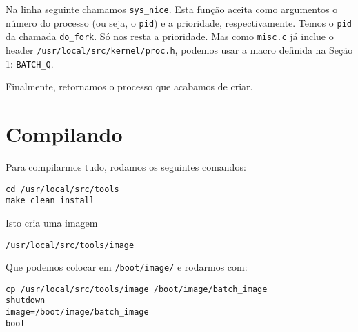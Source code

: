 \documentclass{amsart}
\theoremstyle{plain}
\newcommand{\code}[1]{\lstinline[mathescape=true]{#1}}
\begin{document}
Na linha seguinte chamamos \code{sys_nice}. Esta função aceita como argumentos o número do processo
(ou seja, o \code{pid}) e a prioridade, respectivamente. Temos o \code{pid} da chamada
\code{do_fork}. Só nos resta a prioridade. Mas como \code{misc.c} já inclue o header
\code{/usr/local/src/kernel/proc.h}, podemos usar a macro definida na Seção 1: \code{BATCH_Q}.

Finalmente, retornamos o processo que acabamos de criar.

\section{Compilando}

Para compilarmos tudo, rodamos os seguintes comandos:

\begin{lstlisting}[frame=leftline,mathescape=true,style=nonumbers]
cd /usr/local/src/tools
make clean install
\end{lstlisting}

Isto cria uma imagem

\begin{lstlisting}[frame=leftline,mathescape=true,style=nonumbers]
/usr/local/src/tools/image
\end{lstlisting}

Que podemos colocar em \code{/boot/image/} e rodarmos com:

\begin{lstlisting}[frame=leftline,mathescape=true,style=nonumbers]
cp /usr/local/src/tools/image /boot/image/batch_image
shutdown
image=/boot/image/batch_image
boot
\end{lstlisting}
\end{document}
